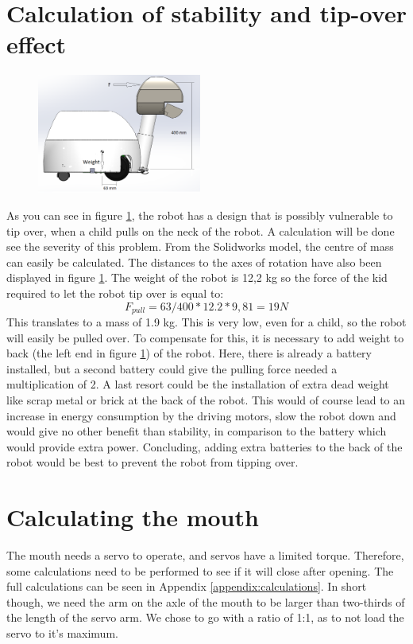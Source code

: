 \documentclass[11pt,twoside,a4paper]{report}
\begin{document}
\section{Calculation of stability and tip-over effect}
\begin{figure}
  \begin{center}
    \includegraphics[width=0.48\textwidth]{Images/Weight.png}
  \end{center}
  \caption{ }
  \label{figure:weigth}
\end{figure}
As you can see in figure \ref{figure:weigth}, the robot has a design that is possibly vulnerable to tip over, when a child pulls on the neck of the robot. A calculation will be done see the severity of this problem. From the Solidworks model, the centre of mass can easily be calculated. The distances to the axes of rotation have also been displayed in figure \ref{figure:weigth}. The weight of the robot is 12,2 kg so the force of the kid required to let the robot tip over is equal to:
\[F_{pull} = 63/400 *12.2*9,81 = 19 N \]  
This translates to a mass of 1.9 kg. This is very low, even for a child, so the robot will easily be pulled over. To compensate for this, it is necessary to add weight to back (the left end in figure \ref{figure:weigth}) of the robot. Here, there is already a battery installed, but a second battery could give the pulling force needed a multiplication of 2. A last resort could be the installation of extra dead weight like scrap metal or brick at the back of the robot. This would of course lead to an increase in energy consumption by the driving motors, slow the robot down and would give no other benefit than stability, in comparison to the battery which would provide extra power. Concluding, adding extra batteries to the back of the robot would be best to prevent the robot from tipping over.

\section{Calculating the mouth}
The mouth needs a servo to operate, and servos have a limited torque. Therefore, some calculations need to be performed to see if it will close after opening. 
The full calculations can be seen in Appendix \ref{appendix:calculations}. In short though, we need the arm on the axle of the mouth to be larger than two-thirds of the length of the servo arm. We chose to go with a ratio of 1:1, as to not load the servo to it’s maximum.
\end{document}
